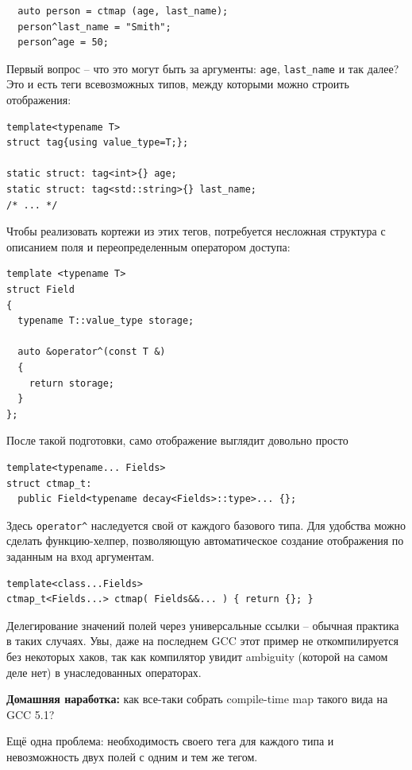 \documentclass[a4paper,12pt,oneside]{article}
\begin{document}
\begin{lstlisting}
  auto person = ctmap (age, last_name);
  person^last_name = "Smith";
  person^age = 50;
\end{lstlisting}

Первый вопрос -- что это могут быть за аргументы: \lstinline!age!, \lstinline!last_name! и так далее? Это и есть теги всевозможных типов, между которыми можно строить отображения:

\begin{lstlisting}
template<typename T>
struct tag{using value_type=T;};

static struct: tag<int>{} age;
static struct: tag<std::string>{} last_name;
/* ... */
\end{lstlisting}

Чтобы реализовать кортежи из этих тегов, потребуется несложная структура с описанием поля и переопределенным оператором доступа:

\begin{lstlisting}
template <typename T>
struct Field 
{
  typename T::value_type storage;

  auto &operator^(const T &) 
  {
    return storage;
  }
};
\end{lstlisting}

После такой подготовки, само отображение выглядит довольно просто

\begin{lstlisting}
template<typename... Fields>
struct ctmap_t: 
  public Field<typename decay<Fields>::type>... {};
\end{lstlisting}

Здесь \lstinline!operator^! наследуется свой от каждого базового типа. Для удобства можно сделать функцию-хелпер, позволяющую автоматическое создание отображения по заданным на вход аргументам.

\begin{lstlisting}
template<class...Fields>
ctmap_t<Fields...> ctmap( Fields&&... ) { return {}; }
\end{lstlisting}

Делегирование значений полей через универсальные ссылки -- обычная практика в таких случаях. Увы, даже на последнем GCC этот пример не откомпилируется без некоторых хаков, так как компилятор увидит ambiguity (которой на самом деле нет) в унаследованных операторах.

\textbf{Домашняя наработка:} как все-таки собрать compile-time map такого вида на GCC 5.1?

Ещё одна проблема: необходимость своего тега для каждого типа и невозможность двух полей с одним и тем же тегом.
\end{document}
